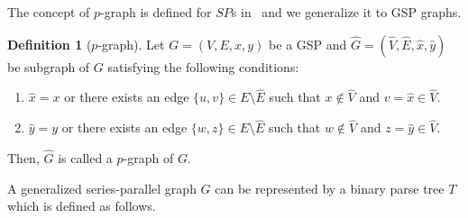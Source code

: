 \documentclass[12pt]{article}
\theoremstyle{definition}
\newtheorem{definition}[theorem]{Definition}
\theoremstyle{remark}
\begin{document}
The concept of $p$-graph is defined for $SP$s in~\cite{kikuno1983linear} and  we generalize it to GSP graphs.   
\begin{definition}[$p$-graph]
		Let $G = (V, E,x,y)$  be a GSP and  $\hat{G} =(\hat{V}, \hat{E},\hat{x},\hat{y})$ be subgraph of $G$ satisfying  the following conditions:
	\begin{enumerate}
		\item
		$\hat{x}=x$ or there exists an edge $\{u,v\}  \in E \setminus \hat{E}$ such that $x \notin \hat{V}$  and $v = \hat{x}\in \hat{V}$.
		\item
		$\hat{y}=y$ or there exists an edge $\{w,z\}\in E \setminus \hat{E}$ such that $w \notin \hat{V}$  and $z = \hat{y}\in \hat{V}$.
	\end{enumerate}
	Then, $\hat{G}$ is called a $p$-graph of $G$.
\end{definition}

A generalized series-parallel graph $G$ can be represented by a binary parse tree $T$ which is defined as follows.
\end{document}

